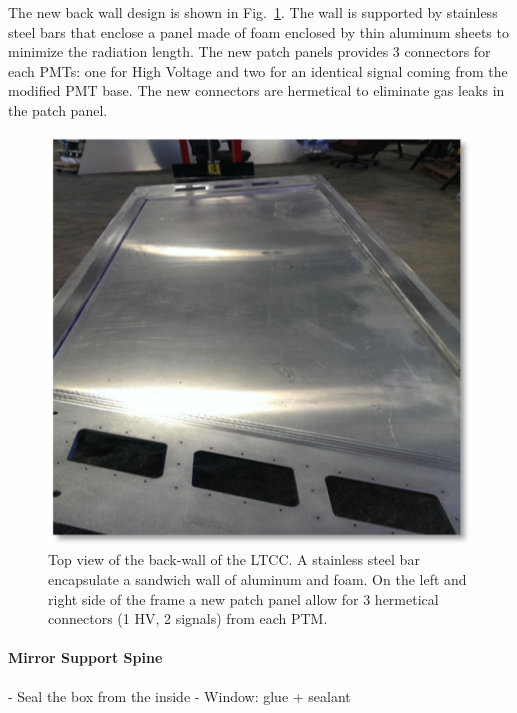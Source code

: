 The new back wall design is shown in Fig.~\ref{fig:backWall}. The wall is supported by stainless steel bars that enclose a panel made of foam enclosed by
thin aluminum sheets to minimize the radiation length.
The new patch panels provides 3 connectors for each PMTs: one for High Voltage and two for an identical signal coming from the modified PMT base.
The new connectors are hermetical to eliminate gas leaks in the patch panel.

\begin{figure}[hbt]
	\centering
	\includegraphics[width=1.0\columnwidth,keepaspectratio]{img/backWall.png}
	\caption{Top view of the back-wall of the LTCC. A stainless steel bar encapsulate a sandwich wall of aluminum and foam. On the left and right side
            of the frame a new patch panel allow for 3 hermetical connectors (1 HV, 2 signals) from each PTM. }
	\label{fig:backWall}
\end{figure}


\paragraph{Mirror Support Spine}



- Seal the box from the inside
- Window: glue + sealant




